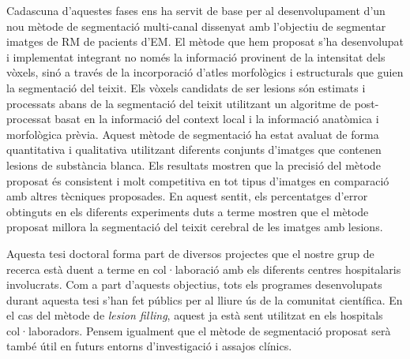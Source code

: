 Cadascuna d'aquestes fases ens ha servit de base per al desenvolupament d'un nou mètode de segmentació multi-canal dissenyat amb l'objectiu de segmentar imatges de RM de pacients d'EM. El mètode que hem proposat s'ha desenvolupat i implementat integrant no només la informació provinent de la intensitat dels vòxels, sinó a través de la incorporació d'atles morfològics i estructurals que guien la segmentació del teixit. Els vòxels candidats de ser lesions són estimats i processats abans de la segmentació del teixit utilitzant un algoritme de post-processat basat en la informació del context local i la informació anatòmica i morfològica prèvia. Aquest mètode de segmentació ha estat avaluat de forma quantitativa i qualitativa utilitzant diferents conjunts d'imatges que contenen lesions de substància blanca. Els resultats mostren que la precisió del mètode proposat és consistent i molt competitiva en tot tipus d'imatges en comparació amb altres tècniques proposades. En aquest sentit, els percentatges d'error obtinguts en els diferents experiments duts a terme mostren que el mètode proposat millora la segmentació del teixit cerebral de les imatges amb lesions.

Aquesta tesi doctoral forma part de diversos projectes que el nostre grup de recerca està duent a terme en col·laboració amb els diferents centres hospitalaris involucrats. Com a part d'aquests objectius, tots els programes desenvolupats durant aquesta tesi s'han fet públics per al lliure ús de la comunitat científica. En el cas del mètode de \textit{lesion filling}, aquest ja està sent utilitzat en els hospitals col·laboradors. Pensem igualment que el mètode de segmentació proposat serà també útil en futurs entorns d'investigació i assajos clínics.
